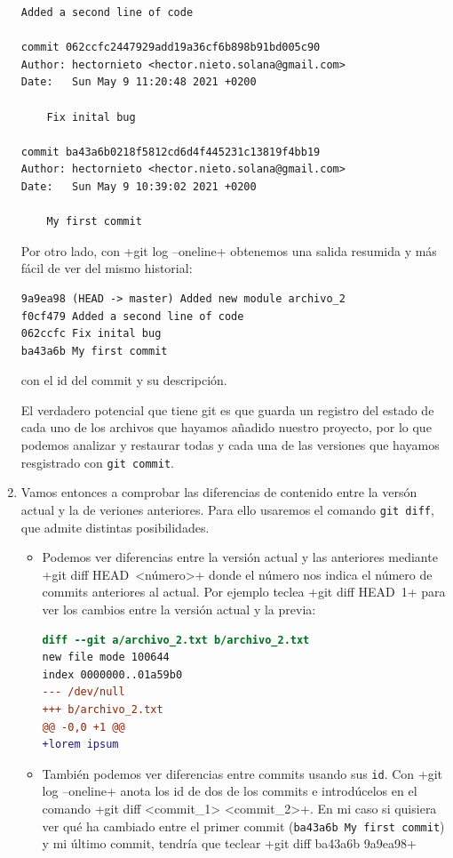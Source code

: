 \documentclass[a5paper, oneside,10pt]{article}
\begin{document}
\begin{enumerate}
\begin{lstlisting}[style=custom]
    Added a second line of code

commit 062ccfc2447929add19a36cf6b898b91bd005c90
Author: hectornieto <hector.nieto.solana@gmail.com>
Date:   Sun May 9 11:20:48 2021 +0200

    Fix inital bug

commit ba43a6b0218f5812cd6d4f445231c13819f4bb19
Author: hectornieto <hector.nieto.solana@gmail.com>
Date:   Sun May 9 10:39:02 2021 +0200

    My first commit
    \end{lstlisting}
    
    Por otro lado, con \cverb+git log --oneline+ obtenemos una salida resumida y más fácil de ver del mismo historial:
    \begin{lstlisting}[style=custom]
9a9ea98 (HEAD -> master) Added new module archivo_2
f0cf479 Added a second line of code
062ccfc Fix inital bug
ba43a6b My first commit
    \end{lstlisting}
    con el id del commit y su descripción.
    
    El verdadero potencial que tiene git es que guarda un registro del estado de cada uno de los archivos que hayamos añadido nuestro proyecto, por lo que podemos analizar y restaurar todas y cada una de las versiones que hayamos resgistrado con \verb+git commit+.
    
    \item Vamos entonces a comprobar las diferencias de contenido entre la versón actual y la de veriones anteriores. Para ello usaremos el comando \verb+git diff+, que admite distintas posibilidades. 
    \begin{itemize}
      \item Podemos ver diferencias entre la versión actual y las anteriores mediante \cverb+git diff HEAD~<número>+ donde el número nos indica el número de commits anteriores al actual. Por ejemplo teclea 
      \cverb+git diff HEAD~1+ 
      para ver los cambios entre la versión actual y la previa:
      \begin{lstlisting}[language=diff]
diff --git a/archivo_2.txt b/archivo_2.txt
new file mode 100644
index 0000000..01a59b0
--- /dev/null
+++ b/archivo_2.txt
@@ -0,0 +1 @@
+lorem ipsum
      \end{lstlisting}
      
      \item También podemos ver diferencias entre commits usando sus \verb+id+. Con \cverb+git log --oneline+ anota los id de dos de los commits e introdúcelos en el comando \cverb+git diff <commit_1> <commit_2>+. En mi caso si quisiera ver qué ha cambiado entre el primer commit (\verb+ba43a6b My first commit+) y mi último commit, tendría que teclear \cverb+git diff ba43a6b 9a9ea98+
      

\end{itemize}
\end{enumerate}
\end{document}
